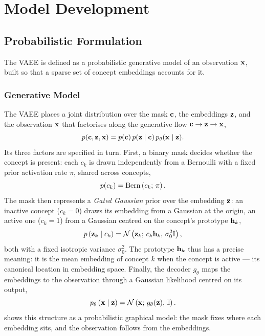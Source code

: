 \section{Model Development} \label{sec:methods:model}

\subsection{Probabilistic Formulation} \label{sec:methods:model:proba}

The \ac{VAEE} is defined as a probabilistic generative model of an
observation $\vb{x}$, built so that a sparse set of concept embeddings
accounts for it.

\subsubsection{Generative Model} \label{sec:methods:model:proba:gen-model}
The \ac{VAEE} places a joint distribution over the mask $\vb{c}$, the embeddings
$\vb{z}$, and the observation $\vb{x}$ that factorises along the generative flow
$\vb{c} \to \vb{z} \to \vb{x}$,
\begin{equation} \label{eq:methods:proba:joint}
    p(\vb{c}, \vb{z}, \vb{x}) = p(\vb{c})\, p(\vb{z} \mid \vb{c})\,
    p_\theta(\vb{x} \mid \vb{z}).
\end{equation}
Its three factors are specified in turn. First, a binary mask decides whether
the concept is present: each $c_k$ is drawn independently from a Bernoulli with
a fixed prior activation rate $\pi$, shared across concepts,
\begin{equation} \label{eq:methods:proba:prior-c}
    p(c_k) = \operatorname{Bern}\left(c_k;\, \pi\right).
\end{equation}
The mask then represents a \textit{Gated Gaussian} prior over the embedding
$\vb{z}$: an inactive concept ($c_k = 0$) draws its embedding from a Gaussian at
the origin, an active one ($c_k = 1$) from a Gaussian centred on the concept's
prototype
$\vb{h}_k$,
\begin{equation} \label{eq:methods:proba:prior-z}
    p\left(\vb{z}_k \mid c_k\right) =
    \mathcal{N}\left(\vb{z}_k;\, c_k \vb{h}_k,\, \sigma_0^2
    \mathbb{I}\right),
\end{equation}
both with a fixed isotropic variance $\sigma_0^2$. The prototype $\vb{h}_k$ thus
has a precise meaning: it is the mean embedding of concept $k$ when the concept
is active --- its canonical location in embedding space. Finally, the decoder
$g_\theta$ maps the embeddings to the observation through a Gaussian likelihood
centred on its output,
\begin{equation} \label{eq:methods:proba:likelihood}
    p_\theta\left(\vb{x} \mid \vb{z}\right) =
    \mathcal{N}\left(\vb{x};\, g_\theta(\vb{z}),\, \mathbb{I}\right).
\end{equation}
 shows this structure as a probabilistic graphical model: the
mask fixes where each embedding sits, and the observation follows from the
embeddings.

